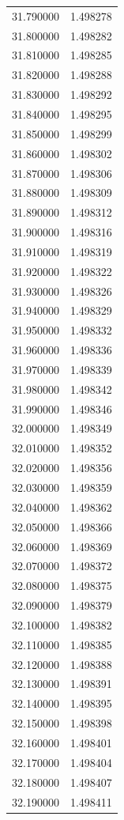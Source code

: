 \begin{tabular}{rr}
31.790000 & 1.498278 \\
31.800000 & 1.498282 \\
31.810000 & 1.498285 \\
31.820000 & 1.498288 \\
31.830000 & 1.498292 \\
31.840000 & 1.498295 \\
31.850000 & 1.498299 \\
31.860000 & 1.498302 \\
31.870000 & 1.498306 \\
31.880000 & 1.498309 \\
31.890000 & 1.498312 \\
31.900000 & 1.498316 \\
31.910000 & 1.498319 \\
31.920000 & 1.498322 \\
31.930000 & 1.498326 \\
31.940000 & 1.498329 \\
31.950000 & 1.498332 \\
31.960000 & 1.498336 \\
31.970000 & 1.498339 \\
31.980000 & 1.498342 \\
31.990000 & 1.498346 \\
32.000000 & 1.498349 \\
32.010000 & 1.498352 \\
32.020000 & 1.498356 \\
32.030000 & 1.498359 \\
32.040000 & 1.498362 \\
32.050000 & 1.498366 \\
32.060000 & 1.498369 \\
32.070000 & 1.498372 \\
32.080000 & 1.498375 \\
32.090000 & 1.498379 \\
32.100000 & 1.498382 \\
32.110000 & 1.498385 \\
32.120000 & 1.498388 \\
32.130000 & 1.498391 \\
32.140000 & 1.498395 \\
32.150000 & 1.498398 \\
32.160000 & 1.498401 \\
32.170000 & 1.498404 \\
32.180000 & 1.498407 \\
32.190000 & 1.498411 \\

\end{tabular}
